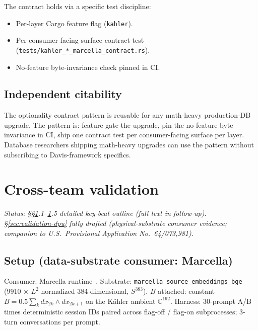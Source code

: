 \documentclass[11pt,letterpaper]{article}
\begin{document}
The contract holds via a specific test discipline:

\begin{itemize}[nosep]
\item Per-layer Cargo feature flag (\texttt{kahler}).
\item Per-consumer-facing-surface contract test
  (\texttt{tests/kahler\_*\_marcella\_contract.rs}).
\item No-feature byte-invariance check pinned in CI.
\end{itemize}

\subsection{Independent citability}

The optionality contract pattern is reusable for any math-heavy
production-DB upgrade. The pattern is: feature-gate the upgrade, pin
the no-feature byte invariance in CI, ship one contract test per
consumer-facing surface per layer. Database researchers shipping
math-heavy upgrades can use the pattern without subscribing to
Davis-framework specifics.


\section{Cross-team validation}
\label{sec:validation}

\noindent\emph{Status: \S\S\ref{sec:validation}.1--\ref{sec:validation}.5
detailed key-beat outline (full text in follow-up).
\S\ref{sec:validation-dpu} fully drafted (physical-substrate consumer
evidence; companion to U.S.\ Provisional Application
No.~64/073,981).}

\subsection{Setup (data-substrate consumer: Marcella)}

Consumer: Marcella runtime~\cite{davis2026sheafcomposition}.
Substrate: \texttt{marcella\_source\_embeddings\_bge} (9910 $\times$
$L^2$-normalized 384-dimensional, $S^{383}$). $B$ attached: constant
$B = 0.5 \sum_k dx_{2k} \wedge dx_{2k+1}$ on the K\"ahler ambient
$\mathbb{C}^{192}$. Harness: 30-prompt A/B times deterministic
session IDs paired across flag-off / flag-on subprocesses; 3-turn
conversations per prompt.
\end{document}
